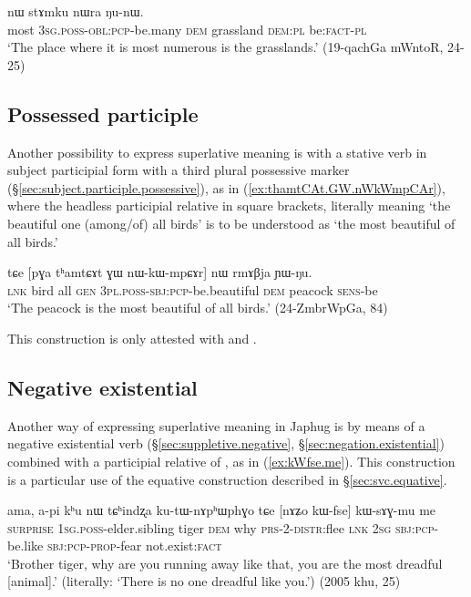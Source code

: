 \begin{exe}
\ex \label{ex:stu.WsAdAn}
 nɯ stɤmku nɯra ŋu-nɯ.   \\
most \textsc{3sg}.\textsc{poss}-\textsc{obl}:\textsc{pcp}-be.many \textsc{dem} grassland \textsc{dem}:\textsc{pl} be:\textsc{fact}-\textsc{pl}  \\
\glt `The place where it is most numerous is the grasslands.' (19-qachGa mWntoR, 24-25)
\end{exe}


 \subsection{Possessed participle} \label{sec:possessed.superlative}
Another possibility to express superlative meaning is with a stative verb in subject participial form with a third plural possessive marker (§\ref{sec:subject.participle.possessive}), as in (\ref{ex:thamtCAt.GW.nWkWmpCAr}), where the headless participial relative in square brackets, literally meaning `the beautiful one (among/of) all birds' is to be understood as `the most beautiful of all birds.' 

 \begin{exe} 
\ex \label{ex:thamtCAt.GW.nWkWmpCAr}
\gll tɕe [pɣa tʰamtɕɤt ɣɯ nɯ-kɯ-mpɕɤr] nɯ rmɤβja ɲɯ-ŋu.  \\
\textsc{lnk} bird all \textsc{gen} \textsc{3pl}.\textsc{poss}-\textsc{sbj}:\textsc{pcp}-be.beautiful \textsc{dem} peacock \textsc{sens}-be \\
\glt `The peacock is the most beautiful of all birds.' (24-ZmbrWpGa, 84)
\end{exe}

This construction is only attested with  and .

 \subsection{Negative existential} \label{sec:negative.existential.superlative}
Another way of expressing superlative meaning in Japhug is by means of a negative existential verb (§\ref{sec:suppletive.negative}, §\ref{sec:negation.existential}) combined with a participial relative of , as in (\ref{ex:kWfse.me}). This construction is a particular use of the equative construction described in §\ref{sec:svc.equative}.


 \begin{exe}
\ex \label{ex:kWfse.me}
\gll ama, a-pi kʰu nɯ tɕʰindʐa ku-tɯ-nɤpʰɯphɣo tɕe [nɤʑo kɯ-fse] kɯ-sɤɣ-mu me	\\
\textsc{surprise} \textsc{1sg}.\textsc{poss}-elder.sibling tiger \textsc{dem} why \textsc{prs}-2-\textsc{distr}:flee \textsc{lnk} \textsc{2sg}  \textsc{sbj}:\textsc{pcp}-be.like   \textsc{sbj}:\textsc{pcp}-\textsc{prop}-fear  not.exist:\textsc{fact} \\
\glt `Brother tiger, why are you running away like that, you are the most dreadful [animal].' (literally: `There is no one dreadful like you.') (2005 khu, 25)
\end{exe}


